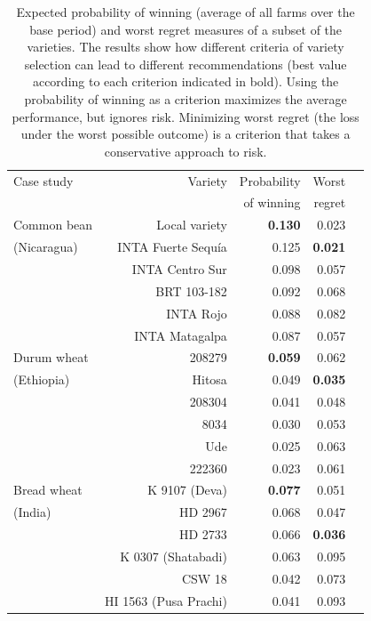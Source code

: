 \documentclass[9pt,twocolumn,twoside]{pnas-new}
\begin{document}
\begin{table}[ht]
\centering
\caption{Expected probability of winning (average of all farms over the base period) and worst regret measures of a subset of the varieties. The results show how different criteria of variety selection can lead to different recommendations (best value according to each criterion indicated in bold). Using the probability of winning as a criterion maximizes the average performance, but ignores risk. Minimizing worst regret (the loss under the worst possible outcome) is a criterion that takes a conservative approach to risk.}

\begin{tabular}{@{\extracolsep{8pt}}lrrrr@{}}
\hline

Case study &  Variety & Probability  & Worst   \\
 &   & of winning &  regret \\
\midrule
Common bean &  	Local variety & 	\textbf{0.130} & 	0.023 \\
(Nicaragua) & 	INTA Fuerte Sequía & 0.125 & 			\textbf{0.021} \\
 			&  	INTA Centro Sur & 	0.098 &				0.057 \\
 			&  	BRT 103-182 & 		0.092 & 			0.068 \\
 			&  	INTA Rojo & 		0.088 & 			0.082 \\
 			&  	INTA Matagalpa & 	0.087 & 			0.057 \\
 \midrule
Durum wheat & 	208279 & 	\textbf{0.059} & 	0.062 \\ 
(Ethiopia) & 	Hitosa & 	0.049 & 			\textbf{0.035} \\ 
 		& 		208304 & 	0.041 & 			0.048 \\ 
 		& 		8034 & 		0.030 & 			0.053 \\ 
 		& 		Ude & 		0.025 & 			0.063 \\ 
        & 		222360 & 		0.023 & 			0.061 \\ 
\midrule
Bread wheat & 	K 9107 (Deva) & \textbf{0.077} & 	0.051 \\ 
(India) & 		HD 2967 & 				0.068 & 	0.047 \\ 
 & 				HD 2733 & 				0.066 & 	\textbf{0.036 }\\ 
 & 				K 0307 (Shatabadi) & 	0.063 & 	0.095 \\ 
 & 				CSW 18 & 				0.042 & 	0.073 \\ 
 & 				HI 1563 (Pusa Prachi) & 0.041 & 	0.093 \\ 
\bottomrule
\end{tabular}
\end{table}
\end{document}
